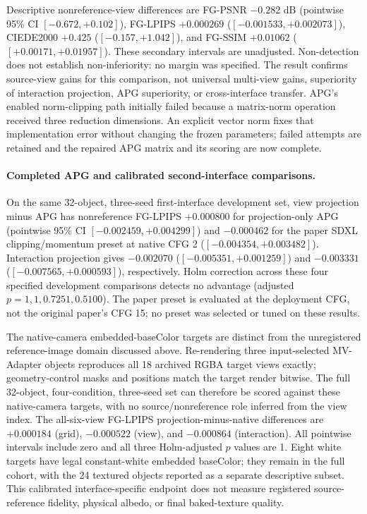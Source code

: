 Descriptive nonreference-view differences are FG-PSNR $-0.282$ dB
(pointwise 95\% CI $[-0.672,+0.102]$), FG-LPIPS $+0.000269$
($[-0.001533,+0.002073]$), CIEDE2000 $+0.425$
($[-0.157,+1.042]$), and FG-SSIM $+0.01062$
($[+0.00171,+0.01957]$). These secondary intervals are unadjusted.
Non-detection does not establish non-inferiority: no margin was specified.
The result confirms source-view gains for this comparison, not universal
multi-view gains, superiority of interaction projection, APG superiority,
or cross-interface transfer. APG's enabled norm-clipping path initially
failed because a matrix-norm operation received three reduction dimensions.
An explicit vector norm fixes that implementation error without changing the
frozen parameters; failed attempts are retained and the repaired APG matrix
and its scoring are now complete.

\paragraph{Completed APG and calibrated second-interface comparisons.}
On the same 32-object, three-seed first-interface development set, view
projection minus APG has nonreference FG-LPIPS $+0.000800$ for projection-only
APG (pointwise 95\% CI $[-0.002459,+0.004299]$) and $-0.000462$ for the
paper SDXL clipping/momentum preset at native CFG 2
($[-0.004354,+0.003482]$). Interaction projection gives $-0.002070$
($[-0.005351,+0.001259]$) and $-0.003331$
($[-0.007565,+0.000593]$), respectively. Holm correction across these four
specified development comparisons detects no advantage (adjusted
$p=1,1,0.7251,0.5100$). The paper preset is evaluated at the deployment CFG,
not the original paper's CFG 15; no preset was selected or tuned on these results.

The native-camera embedded-baseColor targets are distinct from the unregistered
reference-image domain discussed above. Re-rendering three input-selected
MV-Adapter objects reproduces all 18 archived RGBA target views exactly;
geometry-control masks and positions match the target render bitwise.
The full 32-object, four-condition, three-seed set can therefore be scored
against these native-camera targets, with no source/nonreference role inferred
from the view index. The all-six-view FG-LPIPS projection-minus-native
differences are $+0.000184$ (grid), $-0.000522$ (view), and $-0.000864$
(interaction). All pointwise intervals include zero and all three Holm-adjusted
$p$ values are 1. Eight white targets have legal constant-white embedded
baseColor; they remain in the full cohort, with the 24 textured objects reported
as a separate descriptive subset. This calibrated interface-specific endpoint
does not measure registered source-reference fidelity, physical albedo, or
final baked-texture quality.

